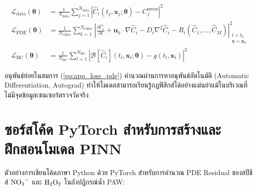 \begin{align}
\mathcal{L}_{\text{data}}(\boldsymbol{\theta}) &= \frac{1}{N_{\text{data}}} \sum_{j=1}^{N_{\text{data}}} \left| \hat{C}_i(t_j, \mathbf{x}_j; \boldsymbol{\theta}) - C_j^{\text{meas}} \right|^2 \label{eq:app_loss_data} \\[6pt]
\mathcal{L}_{\text{PDE}}(\boldsymbol{\theta}) &= \frac{1}{N_{\text{colloc}}} \sum_{k=1}^{N_{\text{colloc}}} \left| \frac{\partial \hat{C}_i}{\partial t} + \mathbf{u}_k \cdot \nabla \hat{C}_i - D_i \nabla^2 \hat{C}_i - R_i(\hat{C}_1, \dots, \hat{C}_M) \right|^2_{\substack{t=t_k \\ \mathbf{x}=\mathbf{x}_k}} \label{eq:app_loss_pde} \\[6pt]
\mathcal{L}_{\text{BC}}(\boldsymbol{\theta}) &= \frac{1}{N_{\text{BC}}} \sum_{l=1}^{N_{\text{BC}}} \left| \mathcal{B}[\hat{C}_i](t_l, \mathbf{x}_l; \boldsymbol{\theta}) - g(t_l, \mathbf{x}_l) \right|^2 \label{eq:app_loss_bc}
\end{align}

อนุพันธ์ย่อยในสมการ (\ref{eq:app_loss_pde}) คำนวณผ่านการหาอนุพันธ์อัตโนมัติ (Automatic Differentiation, Autograd) ทำให้โมเดลสามารถเรียนรู้กฎฟิสิกส์ได้อย่างแม่นยำแม้ในบริเวณที่ไม่มีจุดข้อมูลเซนเซอร์ตรวจวัดจริง

\section{ซอร์สโค้ด PyTorch สำหรับการสร้างและฝึกสอนโมเดล PINN}
\label{app:sec_pinn_code}

ตัวอย่างการเขียนโค้ดภาษา Python ด้วย PyTorch สำหรับการคำนวณ PDE Residual ของสปีชีส์ $\ce{NO3^-}$ และ $\ce{H2O2}$ ในถังปฏิกรณ์น้ำ PAW:

